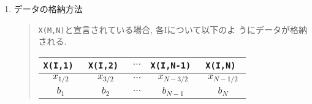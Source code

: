 \documentclass[a4j]{jarticle}
\begin{document}
\begin{enumerate}
  \item データの格納方法
  \begin{quote}
  
  {\tt X(M,N)}と宣言されている場合, 各Iについて以下のよ
   うにデータが格納される.

    \begin{tabular}{|c|c|c|c|c|}\hline
     \tt X(I,1) & \tt X(I,2) & 
     $\cdots$ & \tt X(I,N-1) & \tt X(I,N) \\\hline\hline
      $x_{1/2}$ & $x_{3/2}$ & 
     $\cdots$ & $x_{N-3/2}$ & $x_{N-1/2}$ \\\hline
      $b_1$ & $b_2$ & 
     $\cdots$ & $b_{N-1}$ & $b_N$ \\\hline
    \end{tabular}
  \end{quote}
  
\end{enumerate}
\end{document}
